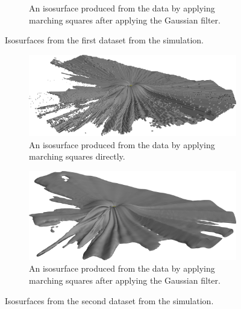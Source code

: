 \documentclass[a4paper,10pt]{report}
\begin{document}
\begin{figure}[H]
\begin{subfigure}{.49\textwidth}
    \caption{An isosurface produced from the data by applying marching squares after applying the Gaussian filter.}
    \end{subfigure}
    \caption{Isosurfaces from the first dataset from the simulation.}
    \label{fig:Dataset1}
\end{figure}
\begin{figure}[H]
    \centering
    \begin{subfigure}{.49\textwidth}
        \includegraphics[width=\textwidth]{../images/3D/Dataset2.png}
    \caption{An isosurface produced from the data by applying marching squares directly.}
    \end{subfigure}
    \hfill
    \begin{subfigure}{.49\textwidth}
        \includegraphics[width=\textwidth]{../images/3D/Dataset2_Gaussian.png}
    \caption{An isosurface produced from the data by applying marching squares after applying the Gaussian filter.}
    \end{subfigure}
    \caption{Isosurfaces from the second dataset from the simulation.}
    \label{fig:Dataset1}
\end{figure}
\end{document}
